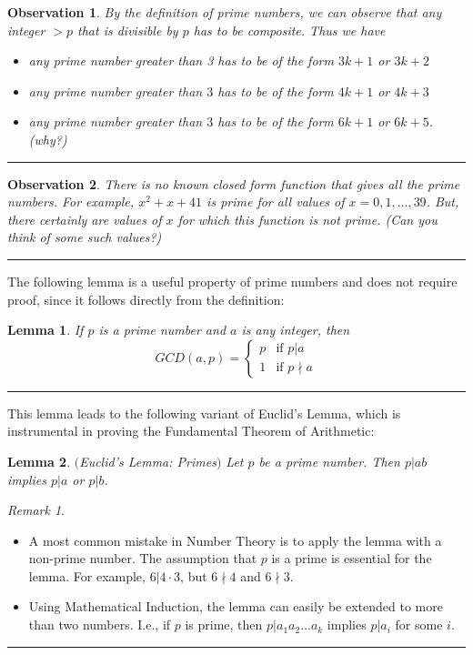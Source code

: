 \documentclass[12pt]{article}
\theoremstyle{plain}
\newtheorem{lemma}{Lemma}
\newtheorem{observation}{Observation}
\theoremstyle{definition}
\theoremstyle{remark}
\newtheorem{remark}{Remark}
\begin{document}
\begin{observation}
By the definition of prime numbers, we can observe that any integer $>p$ that is divisible by $p$ has to be composite. Thus we have 
\begin{itemize}
    \item any prime number greater than 3 has to be of the form $3k+1$ or $3k+2$
    \item any prime number greater than $3$ has to be of the form $4k+1$ or $4k+3$
    \item any prime number greater than $3$ has to be of the form $6k+1$ or $6k+5$. (why?)
\end{itemize}
\end{observation}
\hrule

\begin{observation}
There is no known closed form function that gives all the prime numbers. For example, $x^2+x+41$ is prime for all values of $x=0, 1, \dots, 39$. But, there certainly are values of $x$ for which this function is not prime. (Can you think of some such values?)
\end{observation}
\hrule

\bigskip
\noindent

The following lemma is a useful property of prime numbers and does not require proof, since it follows directly from the definition:
\begin{lemma}
If $p$ is a prime number and $a$ is any integer, then 
$$GCD(a,p) = \left \{ \begin{array}{ll}
p & \textrm{if $p|a$ }\\
1 & \textrm {if $p\nmid a$}
\end{array}\right.$$
\end{lemma}

\hrule

\bigskip
\noindent
This lemma leads to the following variant of Euclid's Lemma, which is instrumental in proving the Fundamental Theorem of Arithmetic:
\begin{lemma}$($Euclid's Lemma: Primes$)$ Let $p$ be a prime number. Then $p|ab$ implies $p|a$ or $p|b$.
\end{lemma}

\bigskip
\noindent
\begin{remark}
\begin{itemize}
\item A most common mistake in Number Theory is to apply the lemma with a non-prime number. The assumption that $p$ is a prime is essential for the lemma. For example, $6|4\cdot 3$, but $6\nmid 4$ and $6\nmid 3$.  
\item Using Mathematical Induction, the lemma can easily be extended to more than two numbers. I.e., if $p$ is prime, then 
$p|a_1a_2\dots a_k$ implies $p|a_i$ for some $i$. 
\end{itemize}
\end{remark}
\hrule
\end{document}
